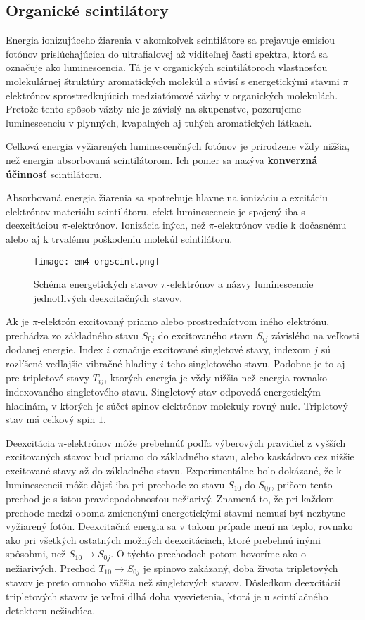\documentclass[../../main.tex]{subfiles}
\begin{document}
\subsection{Organické scintilátory}


Energia ionizujúceho žiarenia v akomkoľvek scintilátore sa prejavuje emisiou fotónov prislúchajúcich do ultrafialovej až viditeľnej časti spektra, ktorá sa označuje ako luminescencia. Tá je v organických scintilátoroch vlastnosťou molekulárnej štruktúry aromatických molekúl a súvisí s energetickými stavmi $\pi$ elektrónov sprostredkujúcich medziatómové väzby v organických molekulách. Pretože tento spôsob väzby nie je závislý na skupenstve, pozorujeme luminescenciu v plynných, kvapalných aj tuhých aromatických látkach.

Celková energia vyžiarených luminescenčných fotónov je prirodzene vždy nižšia, než energia absorbovaná scintilátorom. Ich pomer sa nazýva \textbf{konverzná účinnosť} scintilátoru.

Absorbovaná energia žiarenia sa spotrebuje hlavne na ionizáciu a excitáciu elektrónov materiálu scintilátoru, efekt luminescencie je spojený iba s deexcitáciou $\pi$-elektrónov. Ionizácia iných, než $\pi$-elektrónov vedie k dočasnému alebo aj k trvalému poškodeniu molekúl scintilátoru.

\begin{figure}[h]
\centering
\texttt{[image: em4-orgscint.png]}
\caption{Schéma energetických stavov $\pi$-elektrónov a názvy luminescencie jednotlivých deexcitačných stavov.}
\label{em4:img:orgscint}
\end{figure}

Ak je $\pi$-elektrón excitovaný priamo alebo prostredníctvom iného elektrónu, prechádza zo základného stavu $S_{0j}$ do excitovaného stavu $S_{ij}$ závislého na veľkosti dodanej energie. Index $i$ označuje excitované singletové stavy, indexom $j$ sú rozlíšené vedľajšie vibračné hladiny $i$-teho singletového stavu. Podobne je to aj pre tripletové stavy $T_{ij}$, ktorých energia je vždy nižšia než energia rovnako indexovaného singletového stavu. Singletový stav odpovedá energetickým hladinám, v ktorých je súčet spinov elektrónov molekuly rovný nule. Tripletový stav má celkový spin $1$. 

Deexcitácia $\pi$-elektrónov môže prebehnúť podľa výberových pravidiel z vyšších excitovaných stavov buď priamo do základného stavu, alebo kaskádovo cez nižšie excitované stavy až do základného stavu. Experimentálne bolo dokázané, že k luminescencii môže dôjsť iba pri prechode zo stavu $S_{10}$ do $S_{0j}$, pričom tento prechod je s istou pravdepodobnosťou nežiarivý. Znamená to, že pri každom prechode medzi oboma zmienenými energetickými stavmi nemusí byť nezbytne vyžiarený fotón. Deexcitačná energia sa v takom prípade mení na teplo, rovnako ako pri všetkých ostatných možných deexcitáciach, ktoré prebehnú inými spôsobmi, než $S_{10}\rightarrow S_{0j}$. O týchto prechodoch potom hovoríme ako o nežiarivých. Prechod $T_{10}\rightarrow S_{0j}$ je spinovo zakázaný, doba života tripletových stavov je preto omnoho väčšia než singletových stavov. Dôsledkom deexcitácií tripletových stavov je veľmi dlhá doba vysvietenia, ktorá je u scintilačného detektoru nežiadúca.
\end{document}
